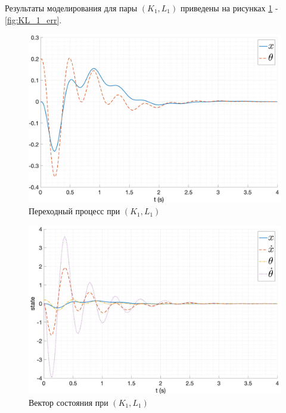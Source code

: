 Результаты моделирования для пары $(K_1, L_1)$ приведены на рисунках \ref{fig:KL_1_out} - \ref{fig:KL_1_err}. 
\begin{figure}[ht!]
    \centering
    \includegraphics[width=\textwidth]{media/plots/nonmodal_observer_controller/kl_1.png}
    \caption{Переходный процесс при $(K_1, L_1)$}
    \label{fig:KL_1_out}
\end{figure}
\begin{figure}[ht!]
    \centering
    \includegraphics[width=\textwidth]{media/plots/nonmodal_observer_controller/state_1.png}
    \caption{Вектор состояния при $(K_1, L_1)$}
    \label{fig:KL_1_state}
\end{figure}
